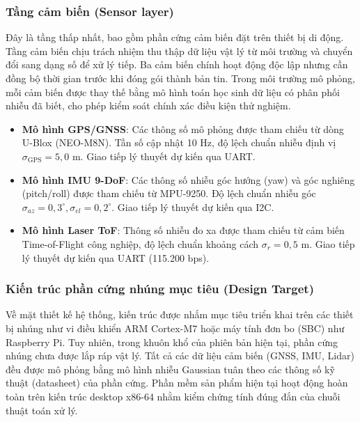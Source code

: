 \subsubsection{Tầng cảm biến (Sensor layer)}

\hspace{0.5cm} Đây là tầng thấp nhất, bao gồm phần cứng cảm biến đặt trên thiết bị di động. Tầng cảm biến chịu trách nhiệm thu thập dữ liệu vật lý từ môi trường và chuyển đổi sang dạng số để xử lý tiếp. Ba cảm biến chính hoạt động độc lập nhưng cần đồng bộ thời gian trước khi đóng gói thành bản tin. Trong môi trường mô phỏng, mỗi cảm biến được thay thế bằng mô hình toán học sinh dữ liệu có phân phối nhiễu đã biết, cho phép kiểm soát chính xác điều kiện thử nghiệm.

\begin{itemize}
    \item \textbf{Mô hình GPS/GNSS}: Các thông số mô phỏng được tham chiếu từ dòng U-Blox (NEO-M8N). Tần số cập nhật 10 Hz, độ lệch chuẩn nhiễu định vị $\sigma_{\text{GPS}} = 5{,}0$ m. Giao tiếp lý thuyết dự kiến qua UART.
    \item \textbf{Mô hình IMU 9-DoF}: Các thông số nhiễu góc hướng (yaw) và góc nghiêng (pitch/roll) được tham chiếu từ MPU-9250. Độ lệch chuẩn nhiễu góc $\sigma_{az} = 0{,}3^\circ, \sigma_{el} = 0{,}2^\circ$. Giao tiếp lý thuyết dự kiến qua I2C.
    \item \textbf{Mô hình Laser ToF}: Thông số nhiễu đo xa được tham chiếu từ cảm biến Time-of-Flight công nghiệp, độ lệch chuẩn khoảng cách $\sigma_r = 0{,}5$ m. Giao tiếp lý thuyết dự kiến qua UART (115.200 bps).
\end{itemize}

\subsubsection{Kiến trúc phần cứng nhúng mục tiêu (Design Target)}

\hspace{0.5cm} Về mặt thiết kế hệ thống, kiến trúc được nhắm mục tiêu triển khai trên các thiết bị nhúng như vi điều khiển ARM Cortex-M7 hoặc máy tính đơn bo (SBC) như Raspberry Pi. Tuy nhiên, trong khuôn khổ của phiên bản hiện tại, phần cứng nhúng chưa được lắp ráp vật lý. Tất cả các dữ liệu cảm biến (GNSS, IMU, Lidar) đều được mô phỏng bằng mô hình nhiễu Gaussian tuân theo các thông số kỹ thuật (datasheet) của phần cứng. Phần mềm sản phẩm hiện tại hoạt động hoàn toàn trên kiến trúc desktop x86-64 nhằm kiểm chứng tính đúng đắn của chuỗi thuật toán xử lý.

